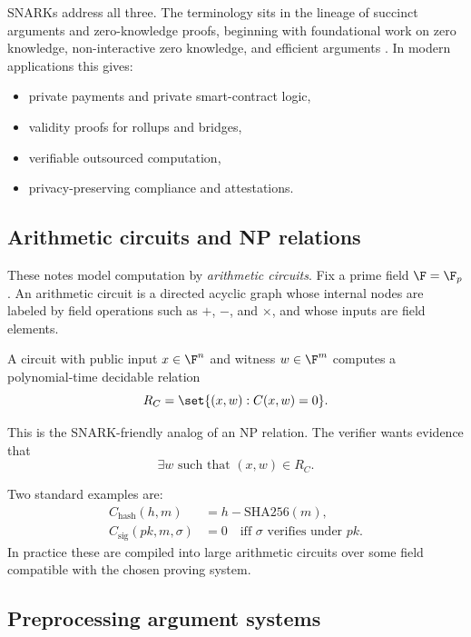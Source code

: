 SNARKs address all three. The terminology sits in the lineage of succinct arguments and zero-knowledge proofs, beginning with foundational work on zero knowledge, non-interactive zero knowledge, and efficient arguments \cite{GoldwasserMicaliRackoff1989,BlumFeldmanMicali1988,Kilian1992}. In modern applications this gives:
\begin{itemize}[leftmargin=2em]
    \item private payments and private smart-contract logic,
    \item validity proofs for rollups and bridges,
    \item verifiable outsourced computation,
    \item privacy-preserving compliance and attestations.
\end{itemize}

\subsection{Arithmetic circuits and NP relations}

These notes model computation by \emph{arithmetic circuits}. Fix a prime field $\F=\F_p$. An arithmetic circuit is a directed acyclic graph whose internal nodes are labeled by field operations such as $+$, $-$, and $\times$, and whose inputs are field elements.

A circuit with public input $x\in \F^n$ and witness $w\in \F^m$ computes a polynomial-time decidable relation
\[
R_C = \set{(x,w) : C(x,w)=0}.
\]

This is the SNARK-friendly analog of an NP relation. The verifier wants evidence that
\[
\exists w \text{ such that } (x,w)\in R_C.
\]

\begin{example}
Two standard examples are:
\begin{align*}
C_{\mathrm{hash}}(h,m) &= h - \mathrm{SHA256}(m),\\
C_{\mathrm{sig}}(pk,m,\sigma) &= 0 \quad \text{iff } \sigma \text{ verifies under } pk.
\end{align*}
In practice these are compiled into large arithmetic circuits over some field compatible with the chosen proving system.
\end{example}

\subsection{Preprocessing argument systems}

